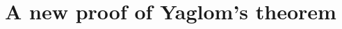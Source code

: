 \documentclass[12pt,a4paper]{amsart}
\newtheorem{lem}[thm]{Lemma}
\numberwithin{equation}{section}
\begin{document}
\section{A new proof of Yaglom's theorem}
\label{sec:anewproofofyaglomslaw}

\begin{comment}
\begin{lem}
	\label{lem:zeroinequality}
	Suppose that $c>0$ is a constant, and $F:[0,\infty)\to [0,1]$  is a function satisfying that, for any $\lambda\geq 0$,
	\begin{equation}
		\label{eq:zeroinequality}
		F(\lambda)
		\leq
		\frac{1}{c}\int_0^1du
		\cdot
		\int_0^\lambda F(us)ds.
	\end{equation}
	Then $F\equiv 0$.
\end{lem}
\begin{proof}
	We first show that $F(\lambda)=0$ for $\lambda \in [0,c)$.
	Using  $F(us)\leq 1$ on the right hand of \eqref{eq:zeroinequality} gives us
	\begin{equation*}
		F(\lambda)
		\leq
		\frac{1}{c}\int_0^1du
		\cdot
		\int_0^\lambda ds
		=
		\frac{\lambda}{c},
		\quad
		\lambda\geq 0.
	\end{equation*}
	Plugging this new upper bound into the right hand of \eqref{eq:zeroinequality} gives an updated upper bound of $F$:
	\begin{equation*}
		F(\lambda)
		\leq \frac{1}{c}\int_0^1du \cdot \int_0^\lambda \frac{us}{c}ds \leq \frac{1}{c}\int_0^1du \cdot \int_0^\lambda \frac{\lambda}{c}ds
		= \Big(\frac{\lambda}{c}\Big)^2,
		\quad
		\lambda\geq 0.
	\end{equation*}
	Repeating this process, we will have $F(\lambda)\leq (\frac{\lambda}{c})^m$ for any $m>0$. Therefore $F=0$ on $[0,c)$.
	
	To complete the proof, we then show that, for any $k\in\mathbb N$, $F=0$ on $[0,kc)$ implies that $F=0$ on $[0,(k+1)c)$.
	Actually, since $F=0$ on $[0,kc)$, we have
	\begin{equation*}
		F ( k c + \lambda )
		\leq
		\frac { 1 } { c } \int_0^1 du \cdot \int_0^{ k c + \lambda } F ( u s ) ds
		=
		\frac{1}{c}\int_0^1du\cdot\int_{kc}^{kc+\lambda}
		F(us)ds\leq\frac{\lambda}{c}, \quad \lambda\geq 0.
	\end{equation*}
	Iterating, we get that
	\begin{equation*}
		F(kc+\lambda)
		\leq
		\frac{1}{c}\int_0^1du\cdot\int_{kc}^{kc+\lambda} F(us)ds
		\leq
		\frac{1}{c}\int_0^1du\cdot\int_{kc}^{kc+\lambda} \frac{\lambda}{c}ds
		\leq
		\Big(\frac{\lambda}{c}\Big)^2, \quad \lambda\geq 0.
	\end{equation*}
	Repeating this process gives that $F(kc+\lambda)\leq (\frac{\lambda}{c})^m$ for any $m>0$. Therefore $F=0$ on $[0,(k+1)c)$. The rest of the proof follows by induction.
\end{proof}
\end{comment}
\end{document}
